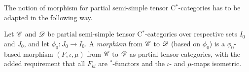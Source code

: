 The notion of morphism for partial semi-simple tensor C$^*$-categories has to be adapted in the following way.

\begin{Def} Let $\mathscr{C}$ and $\mathscr{D}$ be partial semi-simple tensor C$^*$-categories over respective sets $I_0$ and $J_0$, and let $\phi_0:J_0\rightarrow I_0$. 
A \emph{morphism} from $\mathscr{C}$ to $\mathscr{D}$ (based on $\phi_0$) is a $\phi_0$-based morphism $(F,\iota,\mu)$ from $\mathscr{C}$ to $\mathscr{D}$ as partial tensor categories, with the added requirement that all $F_{kl}$ are $^*$-functors and the $\iota$- and $\mu$-maps isometric. 
\end{Def} 

